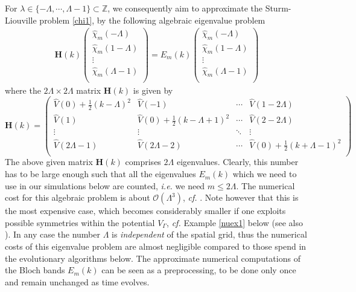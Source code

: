 \documentclass[leqno,final]{siamltex}
\numberwithin{equation}{section}
\newcounter{me}
\begin{document}
For $\lambda \in \{-\Lambda,\cdots,\Lambda-1 \}\subset \mathbb Z$,
we consequently aim to approximate the Sturm-Liouville problem
\eqref{chi1}, by the following algebraic eigenvalue problem
\begin{eqnarray}\label{chieig}
{{\mathbf H}}(k)\left(\begin{array}{c}
  \widehat \chi_m(-\Lambda) \\
  \widehat \chi_m(1-\Lambda) \\
  \vdots \\
  \widehat \chi_m(\Lambda-1) \\
\end{array}\right) =E_m(k)
\left(\begin{array}{c}
  \widehat \chi_m(-\Lambda) \\
  \widehat \chi_m(1-\Lambda) \\
  \vdots \\
  \widehat \chi_m(\Lambda-1) \\
\end{array}\right) \end{eqnarray} where the $2\Lambda\times 2\Lambda$ matrix ${{\mathbf H}}(k)$ is
given by \begin{equation} \label{Hk}
{{\mathbf H}}(k)=\left(\begin{array}{cccc}
  \widehat V(0)+{\frac{{1}}{{2}}}(k-\Lambda)^2 & \widehat V(-1) & \cdots &
  \widehat V(1-2\Lambda) \\
  \widehat V(1) & \widehat V(0)+{\frac{{1}}{{2}}}(k-\Lambda+1)^2  & \cdots &
  \widehat V(2-2\Lambda) \\
  \vdots & \vdots & \ddots & \vdots \\
  \widehat V(2\Lambda-1) & \widehat V(2\Lambda-2) & \cdots & \widehat
  V(0)+{\frac{{1}}{{2}}}(k+\Lambda-1)^2  \\
\end{array}\right) \end{equation} The above given matrix ${{\mathbf H}}(k)$ comprises $2\Lambda$
eigenvalues. Clearly, this number has to be large enough such that
all the eigenvalues $E_m(k)$ which we need to use in our
simulations below are counted, {{\sl i.e.\/ }} we need $m \leq 2\Lambda$. The
numerical cost for this algebraic problem is about
${\mathcal O}(\Lambda^3)$, {{\sl cf.\/ }} \cite{HJ}. Note however that this is the most
expensive case, which becomes considerably smaller if one exploits
possible symmetries within the potential $V_\Gamma$, {{\sl cf.\/ }} Example
\ref{nuex1} below (see also \cite{Bu, Ko, HFKW, Ze}). In any case
the number $\Lambda$ is \emph{independent} of the spatial grid,
thus the numerical costs of this eigenvalue problem are almost
negligible compared to those spend in the evolutionary algorithms
below. The approximate numerical computations of the Bloch bands
$E_m(k)$ can be seen as a preprocessing, to be done only once and
remain unchanged as time evolves.
\end{document}
